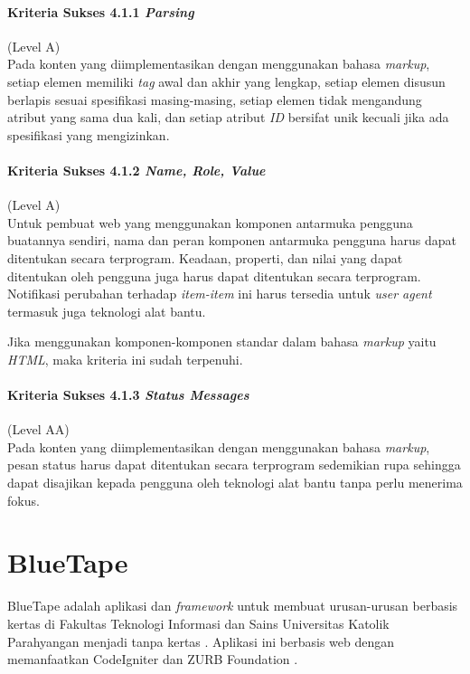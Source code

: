 \paragraph{Kriteria Sukses 4.1.1 \textit{Parsing}}
\label{sec:kriteria_sukses_4.1.1}
(Level A)\\

Pada konten yang diimplementasikan dengan menggunakan bahasa \textit{markup}, setiap elemen memiliki \textit{tag} awal dan akhir yang lengkap, setiap elemen disusun berlapis sesuai spesifikasi masing-masing, setiap elemen tidak mengandung atribut yang sama dua kali, dan setiap atribut \textit{ID} bersifat unik kecuali jika ada spesifikasi yang mengizinkan.

\paragraph{Kriteria Sukses 4.1.2 \textit{Name, Role, Value}}
\label{sec:kriteria_sukses_4.1.2}
(Level A)\\

Untuk pembuat web yang menggunakan komponen antarmuka pengguna buatannya sendiri, nama dan peran komponen antarmuka pengguna harus dapat ditentukan secara terprogram. Keadaan, properti, dan nilai yang dapat ditentukan oleh pengguna juga harus dapat ditentukan secara terprogram. Notifikasi perubahan terhadap \textit{item-item} ini harus tersedia untuk \textit{user agent} termasuk juga teknologi alat bantu.

Jika menggunakan komponen-komponen standar dalam bahasa \textit{markup} yaitu \textit{HTML}, maka kriteria ini sudah terpenuhi.

\paragraph{Kriteria Sukses 4.1.3 \textit{Status Messages}}
\label{sec:kriteria_sukses_4.1.3}
(Level AA)\\

Pada konten yang diimplementasikan dengan menggunakan bahasa \textit{markup}, pesan status harus dapat ditentukan secara terprogram sedemikian rupa sehingga dapat disajikan kepada pengguna oleh teknologi alat bantu tanpa perlu menerima fokus.



\section{BlueTape}
\label{sec:bluetape}
BlueTape adalah aplikasi dan \textit{framework} untuk membuat urusan-urusan berbasis kertas di Fakultas Teknologi Informasi dan Sains Universitas Katolik Parahyangan menjadi tanpa kertas \cite{BlueTape}. Aplikasi ini berbasis web dengan memanfaatkan CodeIgniter \cite{CodeIgniter} dan ZURB Foundation \cite{Foundation}.

